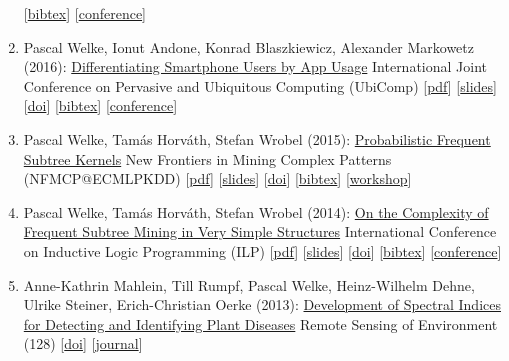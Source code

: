 \documentclass{scrartcl}
\begin{document}
\begin{enumerate}
{[\href{https://dblp.org/rec/conf/dis/UllrichMW16.bib}{bibtex}]
[\href{https://pwelke.github.io/http://ds2016.di.uniba.it/}{conference}]
}
\item
\label{welke2016ubicomp}
Pascal Welke, Ionut Andone, Konrad Blaszkiewicz, Alexander Markowetz (2016):\newline
\href{https://dx.doi.org/10.1145/2971648.2971707}{Differentiating Smartphone Users by App Usage}\newline
International Joint Conference on Pervasive
and Ubiquitous Computing (UbiComp)\newline
{\footnotesize
[\href{https://pwelke.github.io/publications/welke2016ubicomp.pdf}{pdf}]
[\href{https://pwelke.github.io/publications/welke2016ubicomp-slides.pdf}{slides}]
[\href{https://dx.doi.org/10.1145/2971648.2971707}{doi}]
[\href{https://dblp.org/rec/conf/huc/WelkeABM16.bib}{bibtex}]
[\href{https://pwelke.github.io/http://ubicomp.org/ubicomp2016/}{conference}]
}
\item
\label{welke2015nfmcp}
Pascal Welke, Tamás Horváth, Stefan Wrobel (2015):\newline
\href{https://dx.doi.org/10.1007/978-3-319-39315-5_12}{Probabilistic Frequent Subtree Kernels}\newline
New Frontiers in Mining Complex Patterns (NFMCP@ECMLPKDD)\newline
{\footnotesize
[\href{https://pwelke.github.io/publications/welke2015nfmcp.pdf}{pdf}]
[\href{https://pwelke.github.io/publications/welke2015nfmcp-slides.pdf}{slides}]
[\href{https://dx.doi.org/10.1007/978-3-319-39315-5_12}{doi}]
[\href{https://dblp.org/rec/conf/pkdd/WelkeHW15.bib}{bibtex}]
[\href{https://pwelke.github.io/http://www.di.uniba.it/~loglisci/nfMCP15/}{workshop}]
}
\item
\label{welke2014ilp}
Pascal Welke, Tamás Horváth, Stefan Wrobel (2014):\newline
\href{https://dx.doi.org/10.1007/978-3-319-23708-4_14}{On the Complexity of Frequent Subtree Mining in Very Simple Structures}\newline
International Conference on Inductive Logic Programming (ILP)\newline
{\footnotesize
[\href{https://pwelke.github.io/publications/welke2014ilp.pdf}{pdf}]
[\href{https://pwelke.github.io/publications/welke2014ilp-slides.pdf}{slides}]
[\href{https://dx.doi.org/10.1007/978-3-319-23708-4_14}{doi}]
[\href{https://dblp.org/rec/conf/ilp/WelkeHW14.bib}{bibtex}]
[\href{https://dtai.cs.kuleuven.be/events/ilp2014/}{conference}]
}
\item
\label{mahlein2013development}
Anne-Kathrin Mahlein, Till Rumpf, Pascal Welke, Heinz-Wilhelm Dehne, Ulrike Steiner, Erich-Christian Oerke (2013):\newline
\href{https://dx.doi.org/10.1016/j.rse.2012.09.019}{Development of Spectral Indices for Detecting and Identifying Plant Diseases}\newline
Remote Sensing of Environment (128)\newline
{\footnotesize
[\href{https://dx.doi.org/10.1016/j.rse.2012.09.019}{doi}]
[\href{https://pwelke.github.io/http://www.journals.elsevier.com/remote-sensing-of-environment}{journal}]
}
\seti
\end{enumerate}
\end{document}

